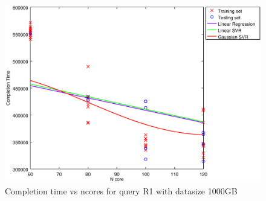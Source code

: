 
\begin {figure}[hbtp]
\centering
\includegraphics[width=\textwidth]{output/R1_1000_LINEAR_NCORE/plot_R1_1000_bestmodels.eps}
\caption{Completion time vs ncores for query R1 with datasize 1000GB}
\label{fig:coreonly_linear_R1_1000}
\end {figure}
